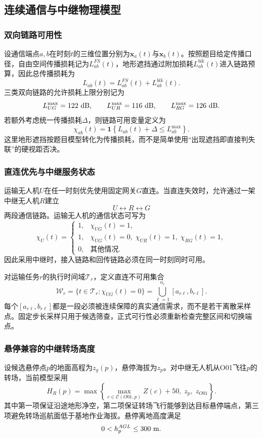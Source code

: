 \documentclass[UTF8,a4paper,12pt]{ctexart}
\begin{document}
\subsection{连续通信与中继物理模型}

\subsubsection{双向链路可用性}

设通信端点$a,b$在时刻$t$的三维位置分别为$\mathbf x_a(t)$与$\mathbf x_b(t)$。按照题目给定传播口径，自由空间传播损耗记为$L^{FS}_{ab}(t)$，地形遮挡通过附加损耗$L^{blk}_{ab}(t)$进入链路预算，因此总传播损耗为
\[
L_{ab}(t)=L^{FS}_{ab}(t)+L^{blk}_{ab}(t).
\]
三类双向链路的允许损耗上限分别记为
\[
L_{UG}^{\max}=122\ {\rm dB},\qquad
L_{UR}^{\max}=116\ {\rm dB},\qquad
L_{RG}^{\max}=126\ {\rm dB}.
\]
若额外考虑统一传播损耗$\Delta$，则链路可用变量定义为
\[
\chi_{ab}(t)
=
\mathbf 1
\left\{
L_{ab}(t)+\Delta
\le L_{ab}^{\max}
\right\}.
\]
这里地形遮挡按题目模型转化为传播损耗，而不是简单使用“出现遮挡即直接判失联”的硬视距否决。

\subsubsection{直连优先与中继服务状态}

运输无人机$U$在任一时刻优先使用固定网关$G$直连。当直连失效时，允许通过一架中继无人机$R$建立
\[
U\leftrightarrow R\leftrightarrow G
\]
两段通信链路。运输无人机的通信状态可写为
\[
\chi_U(t)
=
\begin{cases}
1, & \chi_{UG}(t)=1,\\
1, & \chi_{UG}(t)=0,\;\chi_{UR}(t)=1,\;\chi_{RG}(t)=1,\\
0, & \text{其他情况}.
\end{cases}
\]
因此采用中继时，接入链路和回传链路必须在同一时刻同时可用。

对运输任务$r$的执行时间域$\mathcal T_r$，定义直连不可用集合
\[
\mathcal W_r
=
\{t\in\mathcal T_r:\chi_{UG}(t)=0\}
=
\bigcup_{\ell=1}^{n_r}[a_{r\ell},b_{r\ell}].
\]
每个$[a_{r\ell},b_{r\ell}]$都是一段必须被连续保障的真实通信需求，而不是若干离散采样点。固定步长采样只用于候选筛查，正式可行性必须重新检查完整区间和切换端点。

\subsubsection{悬停兼容的中继转场高度}

设候选悬停点$p$的地面高程为$z_g(p)$，悬停海拔为$z_p$。对中继无人机从O01飞往$p$的转场，当前模型采用
\[
\boxed{
H_R(p)
=
\max\left\{
\max_{c\in\mathcal C(O01,p)}Z(c)+50,\;
z_p,\;
z_{O01}
\right\}.
}
\]
其中第一项保证沿途地形净空，第二项保证转场飞行能够到达目标悬停端点，第三项避免转场巡航面低于基地作业海拔。悬停离地高度满足
\[
0<h_p^{AGL}\le300\ {\rm m}.
\]
\end{document}
